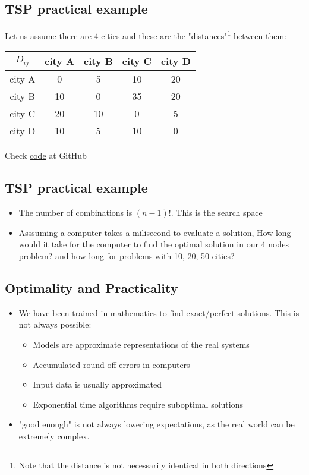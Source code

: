   \subsection{TSP practical example}
  Let us assume there are 4 cities and these are the "distances"\footnote{Note that the distance is not necessarily identical in both directions} between them:
  \begin{center}
  \begin{tabular}{c|cccc}
    $D_{ij}$ & city A & city B & city C & city D \\\hline
    city A & 0 & 5 & 10 & 20  \\
    city B & 10 & 0 & 35 & 20  \\
    city C & 20 & 10 & 0 & 5 \\
    city D & 10 & 5 & 10 & 0
  \end{tabular}
  \end{center}
  Check \href{https://github.com/JordiVillaFreixa/ORcourse/blob/main/code/TSPnaive.ipynb}{code} at GitHub 


  \subsection{TSP practical example}
  \begin{itemize}
    \item The number of combinations is $(n-1)!$. This is the search space
    \item Asssuming a computer takes a milisecond to evaluate a solution, How long would it take for the computer to find the optimal solution in our 4 nodes problem? and how long for problems with 10, 20, 50 cities?
  \end{itemize}


  \subsection{Optimality and Practicality}
  \begin{itemize}
    \item We have been trained in mathematics to find exact/perfect solutions. This is not always possible:
    \begin{itemize}
      \item Models are approximate representations of the real systems
      \item Accumulated round-off errors in computers
      \item Input data is usually approximated
      \item Exponential time algorithms require suboptimal solutions
    \end{itemize}
    \item "good enough" is not always lowering expectations, as the real world can be extremely complex.
  \end{itemize}


